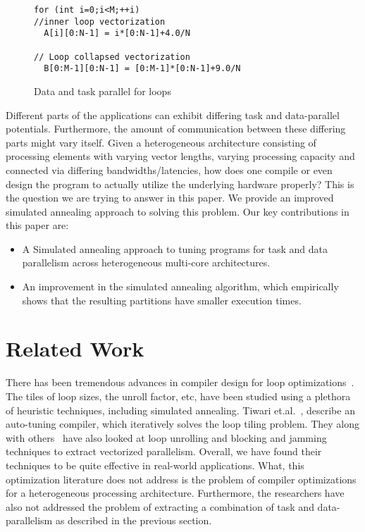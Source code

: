 \documentclass[10pt, conference, compsocconf]{IEEEtran}
\begin{document}
\begin{figure}[h!]
  \centering
\begin{verbatim}
for (int i=0;i<M;++i)
//inner loop vectorization
  A[i][0:N-1] = i*[0:N-1]+4.0/N

// Loop collapsed vectorization
  B[0:M-1][0:N-1] = [0:M-1]*[0:N-1]+9.0/N
\end{verbatim}

  \caption{Data and task parallel for loops}
  \label{fig:3}
\end{figure}

Different parts of the applications can exhibit differing task and
data-parallel potentials. Furthermore, the amount of communication
between these differing parts might vary itself. Given a heterogeneous
architecture consisting of processing elements with varying vector
lengths, varying processing capacity and connected via differing
bandwidths/latencies, how does one compile or even design the program to
actually utilize the underlying hardware properly? This is the question
we are trying to answer in this paper. We provide an improved simulated
annealing approach to solving this problem. Our key contributions in
this paper are:

\begin{itemize}
\item A Simulated annealing approach to tuning programs for task and
  data parallelism across heterogeneous multi-core architectures.
\item An improvement in the simulated annealing algorithm, which
  empirically shows that the resulting partitions have smaller execution
  times.
\end{itemize}


\section{Related Work}
\label{sec:related-work}

There has been tremendous advances in compiler design for loop
optimizations~\cite{ubon08,atiw09,tkis00}. The tiles of loop sizes, the
unroll factor, etc, have been studied using a plethora of heuristic
techniques, including simulated annealing. Tiwari et.al.~\cite{atiw09},
describe an auto-tuning compiler, which iteratively solves the loop
tiling problem. They along with others~\cite{tkis00} have also looked at
loop unrolling and blocking and jamming techniques to extract vectorized
parallelism. Overall, we have found their techniques to be quite
effective in real-world applications. What, this optimization literature
does not address is the problem of compiler optimizations for a
heterogeneous processing architecture. Furthermore, the researchers have
also not addressed the problem of extracting a combination of task and
data-parallelism as described in the previous section. 
\end{document}
